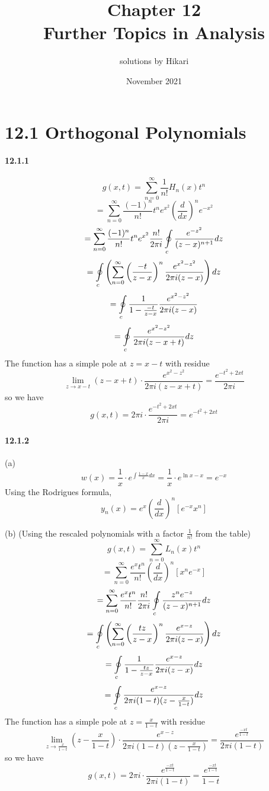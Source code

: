 \documentclass[a4paper]{article}
\title{Chapter 12\\Further Topics in Analysis}
\author{solutions by Hikari}
\date{November 2021}
\begin{document}
\newcommand{\pdv}[2]{\frac{\partial#1}{\partial#2}}
\newcommand{\V}{\mathbf}
\newcommand{\del}{\boldsymbol{\nabla}}
\newcommand{\lfpr}[1]{\left(#1\right)}
\newcommand{\lfbr}[1]{\left[#1\right]}
\def\Xint#1{\mathchoice
   {\XXint\displaystyle\textstyle{#1}}%
   {\XXint\textstyle\scriptstyle{#1}}%
   {\XXint\scriptstyle\scriptscriptstyle{#1}}%
   {\XXint\scriptscriptstyle\scriptscriptstyle{#1}}%
   \!\int}
\def\XXint#1#2#3{{\setbox0=\hbox{$#1{#2#3}{\int}$}
     \vcenter{\hbox{$#2#3$}}\kern-.5\wd0}}
\def\ddashint{\Xint{\;\,-}}
\def\dashint{\Xint-}

\maketitle

\section*{12.1 Orthogonal Polynomials}

\paragraph{12.1.1}
\[
g(x,t)=\sum_{n=0}^\infty\frac{1}{n!}H_n(x)t^n
\]
\[
=\sum_{n=0}^\infty\frac{(-1)^n}{n!}t^ne^{x^2}\left(\frac{d}{dx}\right)^ne^{-x^2}
\]
\[
=\sum_{n=0}^\infty\frac{(-1)^n}{n!}t^ne^{x^2}\frac{n!}{2\pi i}\oint\displaylimits_{c}\frac{e^{-z^2}}{(z-x)^{n+1}}dz
\]
\[
=\oint\displaylimits_c\left(\sum_{n=0}^\infty\left(\frac{-t}{z-x}\right)^n\frac{e^{x^2-z^2}}{2\pi i(z-x)} \right)dz
\]
\[
=\oint\displaylimits_c\frac{1}{1-\frac{-t}{z-x}}\frac{e^{x^2-z^2}}{2\pi i(z-x)}
\]
\[
=\oint\displaylimits_c\frac{e^{x^2-z^2}}{2\pi i(z-x+t)}dz
\]
The function has a simple pole at $z=x-t$ with residue
\[
\lim_{z\to x-t}(z-x+t)\cdot\frac{e^{x^2-z^2}}{2\pi i(z-x+t)}=\frac{e^{-t^2+2xt}}{2\pi i}
\]
so we have
\[
g(x,t)=2\pi i\cdot\frac{e^{-t^2+2xt}}{2\pi i}=e^{-t^2+2xt}
\]

\paragraph{12.1.2}
(a) 
\[
w(x)=\frac{1}{x}\cdot e^{\int\frac{1-x}{x}dx}=\frac{1}{x}\cdot e^{\ln x-x}=e^{-x}
\]
Using the Rodrigues formula, 
\[
y_n(x)=e^x\left(\frac{d}{dx}\right)^n\left[e^{-x}x^n\right]
\]

(b)
(Using the rescaled polynomials with a factor $\frac{1}{n!}$ from the table)
\[
g(x,t)=\sum_{n=0}^\infty L_n(x)t^n
\]
\[
=\sum_{n=0}^\infty\frac{e^xt^n}{n!}\left(\frac{d}{dx}\right)^n\left[x^ne^{-x} \right]
\]
\[
=\sum_{n=0}^\infty\frac{e^xt^n}{n!}\frac{n!}{2\pi i}\oint\displaylimits_c\frac{z^ne^{-z}}{(z-x)^{n+1}}dz
\]
\[
=\oint\displaylimits_c\left(\sum_{n=0}^\infty\left(\frac{tz}{z-x}\right)^n\frac{e^{x-z}}{2\pi i(z-x)} \right)dz
\]
\[
=\oint\displaylimits_c\frac{1}{1-\frac{tz}{z-x}}\frac{e^{x-z}}{2\pi i(z-x)}dz
\]
\[
=\oint\displaylimits_c\frac{e^{x-z}}{2\pi i(1-t)(z-\frac{x}{1-t})}dz
\]
The function has a simple pole at $z=\frac{x}{1-t}$ with residue 
\[
\lim_{z\to\frac{x}{1-t}}(z-\frac{x}{1-t})\cdot\frac{e^{x-z}}{2\pi i(1-t)(z-\frac{x}{1-t})}=\frac{e^{\frac{-xt}{1-t}}}{2\pi i(1-t)}
\]
so we have
\[
g(x,t)=2\pi i\cdot\frac{e^{\frac{-xt}{1-t}}}{2\pi i(1-t)}=\frac{e^{\frac{-xt}{1-t}}}{1-t}
\]
\end{document}
